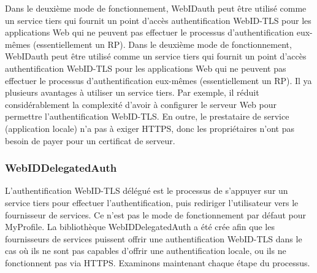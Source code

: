 \documentclass[a4paper]{article}
\begin{document}
Dans le deuxième mode de fonctionnement, WebIDauth peut être utilisé comme un service tiers qui fournit un point d'accès authentification WebID-TLS pour les applications Web qui ne peuvent pas effectuer le processus d'authentification eux-mêmes (essentiellement un RP). Dans le deuxième mode de fonctionnement, WebIDauth peut être utilisé comme un service tiers qui fournit un point d'accès authentification WebID-TLS pour les applications Web qui ne peuvent pas effectuer le processus d'authentification eux-mêmes (essentiellement un RP). Il ya plusieurs avantages à utiliser un service tiers. Par exemple, il réduit considérablement la complexité d'avoir à configurer le serveur Web pour permettre l'authentification WebID-TLS. En outre, le prestataire de service (application locale) n'a pas à exiger HTTPS, donc les propriétaires n'ont pas besoin de payer pour un certificat de serveur.


\subsubsection{WebIDDelegatedAuth}
L'authentification WebID-TLS délégué est le processus de s'appuyer sur un service tiers pour effectuer l'authentification, puis rediriger l'utilisateur vers le fournisseur de services. Ce n'est pas le mode de fonctionnement par défaut pour MyProfile. La bibliothèque WebIDDelegatedAuth a été crée afin que les fournisseurs de services puissent offrir une authentification WebID-TLS dans le cas où ils ne sont pas capables d'offrir une authentification locale, ou ils ne fonctionnent pas via HTTPS. Examinons maintenant chaque étape du processus.\\
\end{document}
